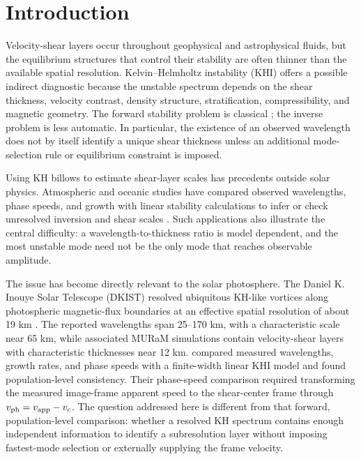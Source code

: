\documentclass[linenumbers]{aastex7}
\begin{document}
\section{Introduction}
Velocity-shear layers occur throughout geophysical and astrophysical fluids, but the equilibrium structures that control their stability are often thinner than the available spatial resolution. Kelvin--Helmholtz instability (KHI) offers a possible indirect diagnostic because the unstable spectrum depends on the shear thickness, velocity contrast, density structure, stratification, compressibility, and magnetic geometry. The forward stability problem is classical \citep{Chandrasekhar1961,Michalke1964,MiuraPritchett1982}; the inverse problem is less automatic. In particular, the existence of an observed wavelength does not by itself identify a unique shear thickness unless an additional mode-selection rule or equilibrium constraint is imposed.

Using KH billows to estimate shear-layer scales has precedents outside solar physics. Atmospheric and oceanic studies have compared observed wavelengths, phase speeds, and growth with linear stability calculations to infer or check unresolved inversion and shear scales \citep[e.g.,][]{Nielsen1992}. Such applications also illustrate the central difficulty: a wavelength-to-thickness ratio is model dependent, and the most unstable mode need not be the only mode that reaches observable amplitude.

The issue has become directly relevant to the solar photosphere. The Daniel K. Inouye Solar Telescope (DKIST) resolved ubiquitous KH-like vortices along photospheric magnetic-flux boundaries at an effective spatial resolution of about 19 km \citep{Kuridze2026}. The reported wavelengths span 25--170 km, with a characteristic scale near 65 km, while associated MURaM simulations contain velocity-shear layers with characteristic thicknesses near 12 km. \citet{Kuridze2026} compared measured wavelengths, growth rates, and phase speeds with a finite-width linear KHI model and found population-level consistency. Their phase-speed comparison required transforming the measured image-frame apparent speed to the shear-center frame through $v_{\rm ph}=v_{\rm app}-v_c$. The question addressed here is different from that forward, population-level comparison: whether a resolved KH spectrum contains enough independent information to identify a subresolution layer without imposing fastest-mode selection or externally supplying the frame velocity.
\end{document}
